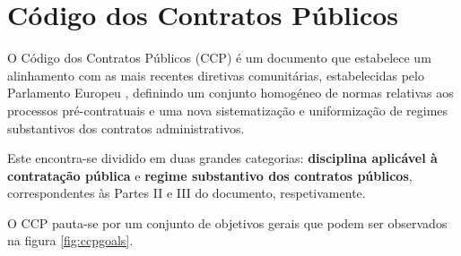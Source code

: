 



\section{Código dos Contratos Públicos}

O Código dos Contratos Públicos (CCP) é um documento que estabelece um alinhamento com as mais recentes diretivas comunitárias,  estabelecidas pelo Parlamento Europeu \cite{ue_dire}, definindo um conjunto homogéneo de normas relativas aos processos pré-contratuais e uma nova sistematização e uniformização de regimes substantivos dos contratos administrativos. 

Este encontra-se dividido em duas grandes categorias: \textbf{disciplina aplicável à contratação pública} e \textbf{regime substantivo dos contratos públicos}, correspondentes às Partes II e III do documento, respetivamente.

O CCP pauta-se por um conjunto de objetivos gerais que podem ser observados na figura \ref{fig:ccpgoals}.

